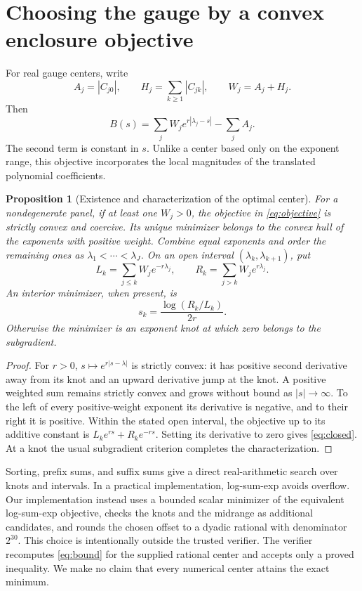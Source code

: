 \documentclass[11pt,a4paper]{article}
\newtheorem{proposition}[theorem]{Proposition}
\begin{document}
\section{Choosing the gauge by a convex enclosure objective}
For real gauge centers, write
\begin{equation}
 A_j=|C_{j0}|,\qquad H_j=\sum_{k\ge1}|C_{jk}|,\qquad W_j=A_j+H_j.
\end{equation}
Then
\begin{equation}\label{eq:objective}
 B(s)=\sum_j W_j e^{r|\lambda_j-s|}-\sum_j A_j.
\end{equation}
The second term is constant in $s$. Unlike a center based only on the exponent range, this objective incorporates the local magnitudes of the translated polynomial coefficients.

\begin{proposition}[Existence and characterization of the optimal center]\label{prop:convex}
For a nondegenerate panel, if at least one $W_j>0$, the objective in \eqref{eq:objective} is strictly convex and coercive. Its unique minimizer belongs to the convex hull of the exponents with positive weight. Combine equal exponents and order the remaining ones as $\lambda_1<\cdots<\lambda_J$. On an open interval $(\lambda_k,\lambda_{k+1})$, put
\begin{equation}
 L_k=\sum_{j\le k}W_j e^{-r\lambda_j},\qquad
 R_k=\sum_{j>k}W_j e^{r\lambda_j}.
\end{equation}
An interior minimizer, when present, is
\begin{equation}\label{eq:closed}
 s_k=\frac{\log(R_k/L_k)}{2r}.
\end{equation}
Otherwise the minimizer is an exponent knot at which zero belongs to the subgradient.
\end{proposition}
\begin{proof}
For $r>0$, $s\mapsto e^{r|s-\lambda|}$ is strictly convex: it has positive second derivative away from its knot and an upward derivative jump at the knot. A positive weighted sum remains strictly convex and grows without bound as $|s|\to\infty$. To the left of every positive-weight exponent its derivative is negative, and to their right it is positive. Within the stated open interval, the objective up to its additive constant is $L_ke^{rs}+R_ke^{-rs}$. Setting its derivative to zero gives \eqref{eq:closed}. At a knot the usual subgradient criterion completes the characterization.
\end{proof}

Sorting, prefix sums, and suffix sums give a direct real-arithmetic search over knots and intervals. In a practical implementation, log-sum-exp avoids overflow. Our implementation instead uses a bounded scalar minimizer of the equivalent log-sum-exp objective, checks the knots and the midrange as additional candidates, and rounds the chosen offset to a dyadic rational with denominator $2^{30}$. This choice is intentionally outside the trusted verifier. The verifier recomputes \eqref{eq:bound} for the supplied rational center and accepts only a proved inequality. We make no claim that every numerical center attains the exact minimum.
\end{document}
